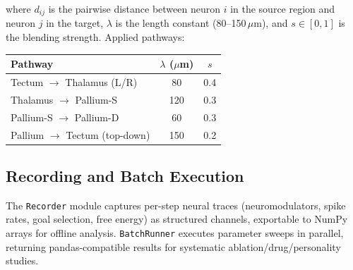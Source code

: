 \documentclass[11pt,a4paper]{article}
\begin{document}
\noindent
where $d_{ij}$ is the pairwise distance between neuron $i$ in the source region
and neuron $j$ in the target, $\lambda$ is the length constant (80--150\,$\mu$m),
and $s \in [0,1]$ is the blending strength.  Applied pathways:

\begin{center}
\begin{tabular}{lcc}
\toprule
\textbf{Pathway} & $\lambda$ ($\mu$m) & $s$ \\
\midrule
Tectum $\to$ Thalamus (L/R) & 80 & 0.4 \\
Thalamus $\to$ Pallium-S     & 120 & 0.3 \\
Pallium-S $\to$ Pallium-D    & 60 & 0.3 \\
Pallium $\to$ Tectum (top-down) & 150 & 0.2 \\
\bottomrule
\end{tabular}
\end{center}

\subsection{Recording and Batch Execution}

The \texttt{Recorder} module captures per-step neural traces
(neuromodulators, spike rates, goal selection, free energy) as structured
channels, exportable to NumPy arrays for offline analysis.
\texttt{BatchRunner} executes parameter sweeps in parallel, returning
pandas-compatible results for systematic ablation/drug/personality studies.
\end{document}
